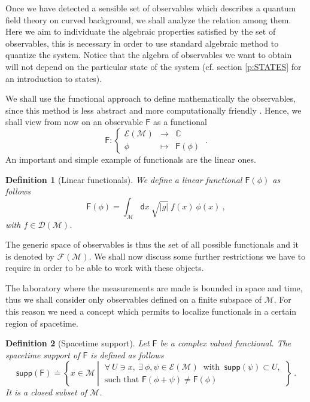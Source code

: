 \documentclass[11pt]{book}
\newcommand{\supp}{\mathsf{supp}}
\newcommand{\abs}[1]{\left|#1\right|}
\newcommand{\Dcal}{\mathcal{D}}
\newcommand{\Ecal}{\mathcal{E}}
\newcommand{\Fcal}{\mathcal{F}}
\newcommand{\Mcal}{\mathcal{M}}
\newcommand{\Cbb}{\mathbb{C}}
\newcommand{\Fsf}{\mathsf{F}}
\newcommand{\dsf}{\mathsf{d}}
\theoremstyle{break}
\newtheorem{definition}{Definition}[chapter]
\begin{document}
Once we have detected a sensible set of observables which describes a quantum field theory on curved background, we shall analyze the relation among them. Here we aim to individuate the algebraic properties satisfied by the set of observables, this is necessary in order to use standard algebraic method to quantize the system. Notice that the algebra of observables we want to obtain will not depend on the particular state of the system (cf. section \ref{p:STATES} for an introduction to states).


We shall use the functional approach to define mathematically the observables, since this method is less abstract and more computationally friendly \cite{BFLR_2012,BDF_2009}. Hence, we shall view from now on an observable $\Fsf$ as a functional 
%
\begin{equation*}
\Fsf : \left\{
\begin{array}{ccc}
\Ecal(\Mcal) & \to     & \Cbb \\
\phi  & \mapsto & \Fsf(\phi)
\end{array}
\right. \ . 
\end{equation*}
%
An important and simple example of functionals are the linear ones. 
%
\begin{definition}[Linear functionals]\label{def:linear_obs}
We define a linear functional $\Fsf(\phi)$ as follows
%
\begin{equation*}
\Fsf(\phi) = \int_\Mcal \dsf x \ \sqrt{\abs{g}} \ f(x) \ \phi(x) \ , 
\end{equation*}
%
with $f \in \Dcal(\Mcal)$.
\end{definition}


The generic space of observables is thus the set of all possible functionals and it is denoted by $\Fcal(\Mcal)$. We shall now discuss some further restrictions we have to require in order to be able to work with these objects.


The laboratory where the measurements are made is bounded in space and time, thus we shall consider only observables defined on a finite subspace of $\Mcal$. For this reason we need a concept which permits to localize functionals in a certain region of spacetime.


\begin{definition}[Spacetime support] \label{def:spacetime_supp}
Let $\Fsf$ be a complex valued functional. The spacetime support of $\Fsf$ is defined as follows
%
\begin{equation*}
\supp(\Fsf) \doteq \left\{ x \in \Mcal \ \left| \ 
\begin{array}{l}
\forall \ U \ni x , \ \exists \ \phi, \psi \in \Ecal(\Mcal) \ \mbox{ with } \ \supp(\psi) \subset U, \\
\mbox{such that } \Fsf(\phi + \psi) \neq \Fsf(\phi)
\end{array}
\right. \right\} \ .
\end{equation*}
It is a closed subset of $\Mcal$.
%
\end{definition}
\end{document}
